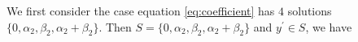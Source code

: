 \documentclass{article}
\newcommand{\TRACE}{\operatorname{Tr}_1^k}
\theoremstyle{nonumberplain}
\newcommand{\0}{\textbf{0}}
\newcommand{\1}{\textbf{1}}
\begin{document}
     We first consider the case equation \eqref{eq:coefficient} has $ 4  $ solutions 
    $ \{0,\alpha_2,\beta_2,\alpha_2+\beta_2\} $. 
    Then $ S=\{0,\alpha_2,\beta_2,\alpha_2+\beta_2\} $ and $ y^{\prime}\in S $, we have 
\end{document}
